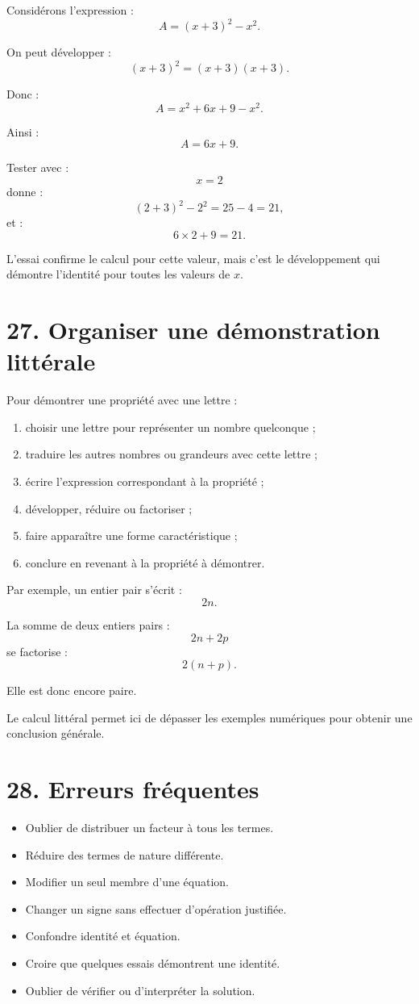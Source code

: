 Considérons l'expression :
\[
A=(x+3)^2-x^2.
\]

On peut développer :
\[
(x+3)^2=(x+3)(x+3).
\]

Donc :
\[
A=x^2+6x+9-x^2.
\]

Ainsi :
\[
\boxed{A=6x+9}.
\]

Tester avec :
\[
x=2
\]
donne :
\[
(2+3)^2-2^2=25-4=21,
\]
et :
\[
6\times2+9=21.
\]

L'essai confirme le calcul pour cette valeur, mais c'est le développement qui démontre l'identité pour toutes les valeurs de $x$.

\section{27. Organiser une démonstration littérale}

Pour démontrer une propriété avec une lettre :
\begin{methode}
\begin{enumerate}
\item choisir une lettre pour représenter un nombre quelconque ;
\item traduire les autres nombres ou grandeurs avec cette lettre ;
\item écrire l'expression correspondant à la propriété ;
\item développer, réduire ou factoriser ;
\item faire apparaître une forme caractéristique ;
\item conclure en revenant à la propriété à démontrer.
\end{enumerate}
\end{methode}

Par exemple, un entier pair s'écrit :
\[
2n.
\]

La somme de deux entiers pairs :
\[
2n+2p
\]
se factorise :
\[
2(n+p).
\]

Elle est donc encore paire.

Le calcul littéral permet ici de dépasser les exemples numériques pour obtenir une conclusion générale.

\section{28. Erreurs fréquentes}

\begin{itemize}
\item Oublier de distribuer un facteur à tous les termes.
\item Réduire des termes de nature différente.
\item Modifier un seul membre d'une équation.
\item Changer un signe sans effectuer d'opération justifiée.
\item Confondre identité et équation.
\item Croire que quelques essais démontrent une identité.
\item Oublier de vérifier ou d'interpréter la solution.
\end{itemize}

